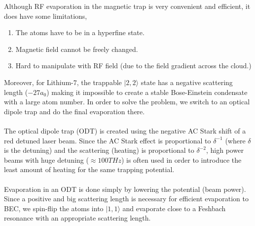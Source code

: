 Although RF evaporation in the magnetic trap is very convenient and efficient, it does have some limitations,
\begin{enumerate}
\item
  The atoms have to be in a hyperfine state.
\item
  Magnetic field cannot be freely changed.
\item
  Hard to manipulate with RF field (due to the field gradient across the cloud.)
\end{enumerate}
Moreover, for Lithium-$7$, the trappable $|2, 2\rangle$ state has a negative scattering length ($-27a_0$) making it impossible to create a stable Bose-Einstein condensate with a large atom number. In order to solve the problem, we switch to an optical dipole trap and do the final evaporation there.\\
\\
The optical dipole trap (ODT) is created using the negative AC Stark shift of a red detuned laser beam. Since the AC Stark effect is proportional to $\delta^{-1}$ (where $\delta$ is the detuning) and the scattering (heating) is proportional to $\delta^{-2}$, high power beams with huge detuning ($\approx100THz$) is often used in order to introduce the least amount of heating for the same trapping potential.\\
\\
Evaporation in an ODT is done simply by lowering the potential (beam power). Since a positive and big scattering length is necessary for efficient evaporation to BEC, we spin-flip the atoms into $|1, 1\rangle$ and evaporate close to a Feshbach resonance with an appropriate scattering length.

